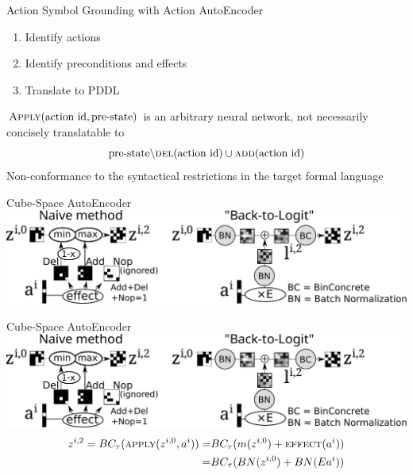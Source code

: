 \documentclass{lecture}
\newcommand{\function}[1]{\textsc{#1}}
\begin{document}
\begin{frame}{Action Symbol Grounding with Action AutoEncoder}
    \begin{enumerate}
        \item[\cmark] Identify actions
        \item[\cmark] Identify preconditions and effects
        \item[\xmark] Translate to PDDL
    \end{enumerate}
    \pause
    $\function{Apply}(\text{action id}, \text{pre-state})$ is an arbitrary neural network, not necessarily concisely translatable to \[\text{pre-state}\backslash \function{del}(\text{action id}) \cup \function{add}(\text{action id})\]
    \pause
    \alert{Non-conformance to the syntactical restrictions in the
    target formal language}
\end{frame}

\begin{frame}{Cube-Space AutoEncoder}
    \includegraphics[width=\textwidth,clip=true,trim=0 0 350 0]{img___latplan___cube-space.pdf}
\end{frame}

\begin{frame}{Cube-Space AutoEncoder}
    \includegraphics[width=\textwidth,clip=true,trim=220 0 0 0]{img___latplan___cube-space.pdf}
    \vfill
    \pause
    \begin{align*}
        z^{i,2} = BC_\tau(\function{apply}(z^{i,0}, a^i)) = & BC_\tau(m(z^{i,0}) + \function{effect}(a^i)) \\        
        = & BC_\tau(BN(z^{i,0}) + BN(Ea^i)) \\
    \end{align*}
    \vfill
\end{frame}
\end{document}

